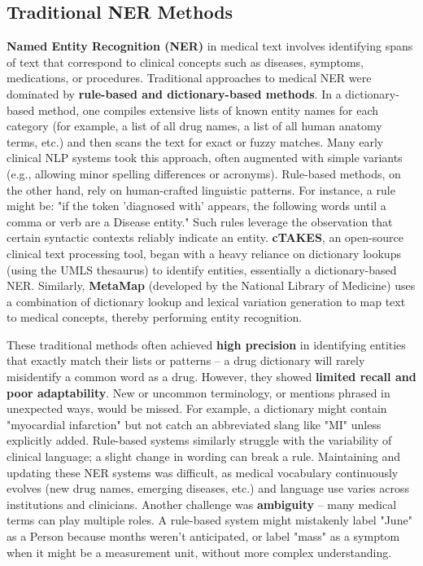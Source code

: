 \subsection{Traditional NER Methods}

\textbf{Named Entity Recognition (NER)} in medical text involves identifying spans of text that correspond to clinical concepts such as diseases, symptoms, medications, or procedures. Traditional approaches to medical NER were dominated by \textbf{rule-based and dictionary-based methods}. In a dictionary-based method, one compiles extensive lists of known entity names for each category (for example, a list of all drug names, a list of all human anatomy terms, etc.) and then scans the text for exact or fuzzy matches. Many early clinical NLP systems took this approach, often augmented with simple variants (e.g., allowing minor spelling differences or acronyms). Rule-based methods, on the other hand, rely on human-crafted linguistic patterns. For instance, a rule might be: "if the token 'diagnosed with' appears, the following words until a comma or verb are a Disease entity." Such rules leverage the observation that certain syntactic contexts reliably indicate an entity. \textbf{cTAKES}, an open-source clinical text processing tool, began with a heavy reliance on dictionary lookups (using the UMLS thesaurus) to identify entities, essentially a dictionary-based NER. Similarly, \textbf{MetaMap} (developed by the National Library of Medicine) uses a combination of dictionary lookup and lexical variation generation to map text to medical concepts, thereby performing entity recognition.

These traditional methods often achieved \textbf{high precision} in identifying entities that exactly match their lists or patterns – a drug dictionary will rarely misidentify a common word as a drug. However, they showed \textbf{limited recall and poor adaptability}. New or uncommon terminology, or mentions phrased in unexpected ways, would be missed. For example, a dictionary might contain "myocardial infarction" but not catch an abbreviated slang like "MI" unless explicitly added. Rule-based systems similarly struggle with the variability of clinical language; a slight change in wording can break a rule. Maintaining and updating these NER systems was difficult, as medical vocabulary continuously evolves (new drug names, emerging diseases, etc.) and language use varies across institutions and clinicians. Another challenge was \textbf{ambiguity} – many medical terms can play multiple roles. A rule-based system might mistakenly label "June" as a Person because months weren't anticipated, or label "mass" as a symptom when it might be a measurement unit, without more complex understanding.


